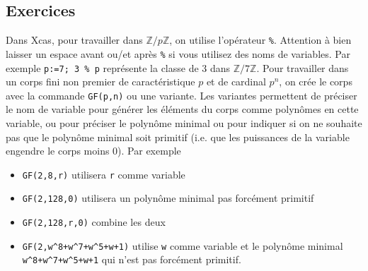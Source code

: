 \documentclass[a4paper,11pt]{book}
\begin{document}
\begin{giacjshere}
\section{Exercices}
Dans Xcas, pour travailler dans $\mathbb{Z}/p\mathbb{Z}$, on utilise l'op\'erateur \verb|%|.
Attention \`a bien laisser un espace avant ou/et apr\`es \verb|%| si vous 
utilisez des noms de variables. Par exemple \verb|p:=7; 3 % p| repr\'esente
la classe de 3 dans $\mathbb{Z}/7\mathbb{Z}$.
Pour travailler dans un corps fini non premier de caract\'eristique $p$
et de cardinal $p^n$,
on cr\'ee le corps avec la commande \verb|GF(p,n)| ou une variante.
Les variantes permettent de pr\'eciser le nom de variable pour 
g\'en\'erer les \'el\'ements du corps comme polyn\^omes en cette variable, 
ou pour pr\'eciser le polyn\^ome minimal ou pour indiquer si on ne souhaite
pas que le polyn\^ome minimal soit primitif (i.e. que les puissances
de la variable engendre le corps moins 0). Par exemple
\begin{itemize}
\item \verb|GF(2,8,r)| utilisera \verb|r| comme variable
\item \verb|GF(2,128,0)| utilisera un polyn\^ome minimal pas forc\'ement 
primitif
\item \verb|GF(2,128,r,0)| combine les deux
\item \verb|GF(2,w^8+w^7+w^5+w+1)| utilise \verb|w| comme variable
et le polyn\^ome minimal \verb|w^8+w^7+w^5+w+1| qui n'est pas forc\'ement
primitif.
\end{itemize}


\end{giacjshere}
\end{document}
